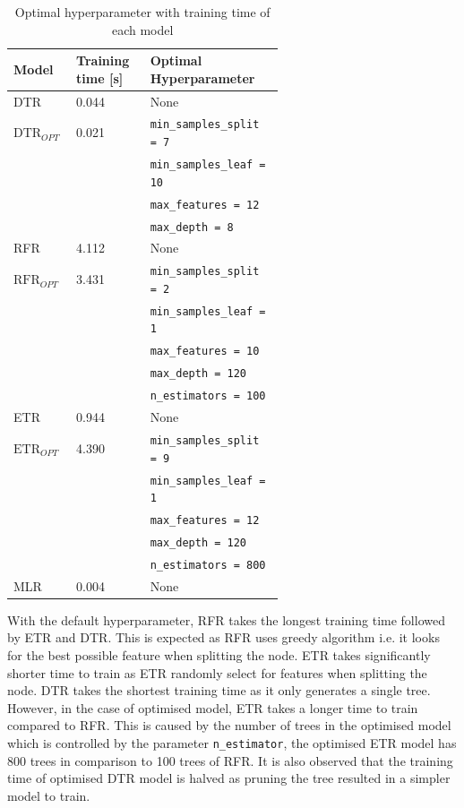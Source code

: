 \begin{table}[ht]
    \footnotesize
    \centering
    {\begin{tabular}{ p{0.1\linewidth} p{0.2\linewidth} p{0.3\linewidth}}
    \hline
    Model & Training time [s] & Optimal Hyperparameter \\
    \hline
    DTR & 0.044 & None \\
    $\text{DTR}_{OPT}$ & 0.021  & {\tt min\_samples\_split = 7}\\
    &&{\tt min\_samples\_leaf = 10}\\
    &&{\tt max\_features = 12}\\
    &&{\tt max\_depth = 8}\\
    RFR & 4.112 & None \\
    $\text{RFR}_{OPT}$ & 3.431  & {\tt min\_samples\_split = 2}\\
    &&{\tt min\_samples\_leaf = 1}\\
    &&{\tt max\_features = 10}\\
    &&{\tt max\_depth = 120}\\
    &&{\tt n\_estimators = 100}\\
    ETR & 0.944 & None \\
    $\text{ETR}_{OPT}$ & 4.390  & {\tt min\_samples\_split = 9}\\
    &&{\tt min\_samples\_leaf = 1}\\
    &&{\tt max\_features = 12}\\
    &&{\tt max\_depth = 120}\\
    &&{\tt n\_estimators = 800}\\
    MLR & 0.004  & None\\
    \hline
    \end{tabular}}
\caption{Optimal hyperparameter with training time of each model}\label{tbl:hpo_optimal}
\end{table}

With the default hyperparameter, RFR takes the longest training time followed by ETR and DTR. This is expected as RFR uses greedy algorithm i.e. it looks for the best possible feature when splitting the node. ETR takes significantly shorter time to train as ETR randomly select for features when splitting the node. DTR takes the shortest training time as it only generates a single tree. However, in the case of optimised model, ETR takes a longer time to train compared to RFR. This is caused by the number of trees in the optimised model which is controlled by the parameter {\tt n\_estimator}, the optimised ETR model has 800 trees in comparison to 100 trees of RFR. It is also observed that the training time of optimised DTR model is halved as pruning the tree resulted in a simpler model to train. \\

